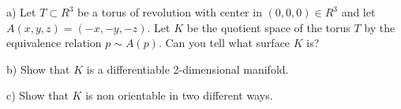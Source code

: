 \documentclass[10pt,letterpaper]{hmcpset}
\begin{document}
\begin{problem}
a) Let $T\subset R^3$ be a torus of revolution with center in 
$(0,0,0)\in R^3$ and let $A(x,y,z)=(-x,-y,-z)$.
Let $K$ be the quotient space of the torus $T$ by the equivalence 
relation $p\sim A(p)$.  Can you tell what surface $K$ is? 
\end{problem}

\newpage
\begin{problem}
b) Show that $K$ is a differentiable 2-dimensional manifold.
\end{problem}

\newpage
\begin{problem}
c) Show that $K$ is non orientable in two different ways.
\end{problem}
\end{document}
